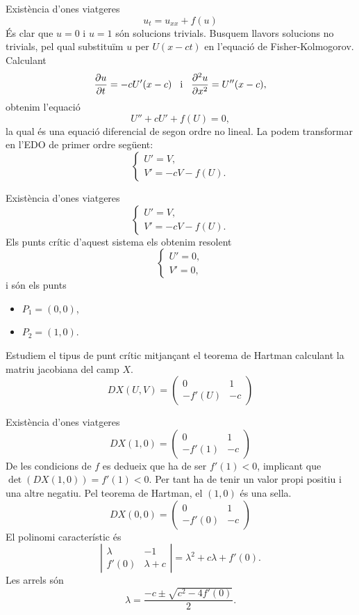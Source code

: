 \documentclass{beamer}
\theoremstyle{definition}
\begin{document}
\begin{frame}{Exist\`{e}ncia d'ones viatgeres}
\[u_t=u_{xx}+f(u)\]
\'{E}s clar que $u=0$ i $u=1$ s\'{o}n solucions trivials. Busquem llavors solucions no trivials, pel qual substitu\"{i}m $u$ per $U(x-ct)$ en l'equaci\'{o} de Fisher-Kolmogorov. \pause Calculant
\[\frac{\partial u}{\partial t}=-cU'(x-c)\hspace{3mm}\text{i}\hspace{3mm}\frac{\partial^2u}{\partial x^2}=U''(x-c),\]
\pause
obtenim l'equaci\'{o}
\[U''+cU'+f(U)=0,\]
la qual \'{e}s una equaci\'{o} diferencial de segon ordre no lineal. \pause La podem transformar en l'EDO de primer ordre seg\"{u}ent:
\[\left\{\begin{array}{ll}U'=V,\\V'=-cV-f(U).\end{array}\right.\]
\end{frame}

\begin{frame}{Exist\`{e}ncia d'ones viatgeres}
\[\left\{\begin{array}{ll}U'=V,\\V'=-cV-f(U).\end{array}\right.\]
Els punts cr\'{i}tic d'aquest sistema els obtenim resolent
\[\left\{\begin{array}{l}U'=0,\\V'=0,\end{array}\right.\]
\pause
i s\'{o}n els punts
\begin{itemize}
\item $P_1=(0,0)$,
\item $P_2=(1,0)$.
\end{itemize}
\pause
Estudiem el tipus de punt cr\'{i}tic mitjan\c{c}ant el teorema de Hartman calculant la matriu jacobiana del camp $X$.
\pause
\[DX(U,V)=\left(\begin{matrix}0&1\\-f'(U)&-c\end{matrix}\right)\]
\end{frame}

\begin{frame}{Exist\`{e}ncia d'ones viatgeres}
\[DX(1,0)=\left(\begin{matrix}0&1\\-f'(1)&-c\end{matrix}\right)\]
\pause
De les condicions de $f$ es dedueix que ha de ser $f'(1)<0$, implicant que $\det(DX(1,0))=f'(1)<0$. Per tant ha de tenir un valor propi positiu i una altre negatiu. Pel teorema de Hartman, el $(1,0)$ \'{e}s una sella.
\pause
\[DX(0,0)=\left(\begin{matrix}0&1\\-f'(0)&-c\end{matrix}\right)\]
\pause
El polinomi caracter\'{i}stic \'{e}s
\[\left|\begin{matrix}\lambda&-1\\f'(0)&\lambda+c\end{matrix}\right|=\lambda^2+c\lambda+f'(0).\]
\pause
Les arrels s\'{o}n
\[\lambda=\frac{-c\pm\sqrt{c^2-4f'(0)}}{2}.\]
\end{frame}
\end{document}
